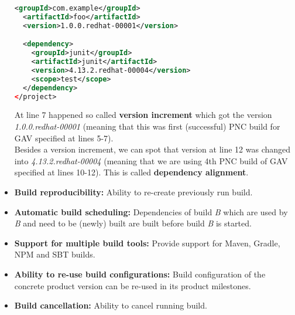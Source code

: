 \documentclass[../main.tex]{subfiles}
\begin{document}
\begin{itemize}
\begin{lstlisting}[language=XML, caption=Same pom.xml after alignment operation]
  <groupId>com.example</groupId>
  <artifactId>foo</artifactId>
  <version>1.0.0.redhat-00001</version>

  <dependency>
    <groupId>junit</groupId>
    <artifactId>junit</artifactId>
    <version>4.13.2.redhat-00004</version>
    <scope>test</scope>
  </dependency>
</project>
\end{lstlisting}

  At line 7 happened so called \textbf{version increment} which got the version \textit{1.0.0.redhat-00001} (meaning that this was first (successful) PNC build for GAV specified at lines 5-7).\\
  Besides a version increment, we can spot that version at line 12 was changed into \textit{4.13.2.redhat-00004} (meaning that we are using 4th PNC build of GAV specified at lines 10-12). This is called \textbf{dependency alignment}.

  \item \textbf{Build reproducibility:} Ability to re-create previously run build.

  \item \textbf{Automatic build scheduling:} Dependencies of build \textit{B} which are used by \textit{B} and need to be (newly) built are built before build \textit{B} is started.

  \item \textbf{Support for multiple build tools:} Provide support for Maven, Gradle, NPM and SBT builds.

  \item \textbf{Ability to re-use build configurations:} Build configuration of the concrete product version can be re-used in its product milestones.

  \item \textbf{Build cancellation:} Ability to cancel running build.

\end{itemize}
\end{document}
